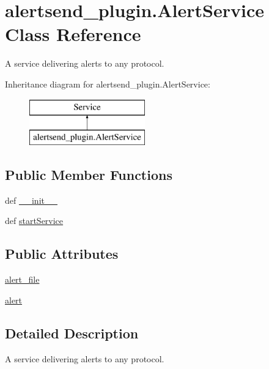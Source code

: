 \hypertarget{classalertsend__plugin_1_1_alert_service}{\section{alertsend\-\_\-plugin.\-Alert\-Service Class Reference}
\label{classalertsend__plugin_1_1_alert_service}
}


A service delivering alerts to any protocol.  


Inheritance diagram for alertsend\-\_\-plugin.\-Alert\-Service\-:\begin{figure}[H]
\begin{center}
\leavevmode
\includegraphics[height=2.000000cm]{d4/d17/classalertsend__plugin_1_1_alert_service}
\end{center}
\end{figure}
\subsection*{Public Member Functions}
\begin{DoxyCompactItemize}
\item 
def \hyperlink{classalertsend__plugin_1_1_alert_service_aad30f49127f44fed9d6bc0ae6ecb9ada}{\-\_\-\-\_\-init\-\_\-\-\_\-}
\item 
def \hyperlink{classalertsend__plugin_1_1_alert_service_ac431be3a763d8f455dd16fcd6f6fe872}{start\-Service}
\end{DoxyCompactItemize}
\subsection*{Public Attributes}
\begin{DoxyCompactItemize}
\item 
\hyperlink{classalertsend__plugin_1_1_alert_service_acc72890f5638b996635878a4b21f7f2b}{alert\-\_\-file}
\item 
\hyperlink{classalertsend__plugin_1_1_alert_service_a91b88386bc56aabc6e5e0477eb4f5946}{alert}
\end{DoxyCompactItemize}


\subsection{Detailed Description}
A service delivering alerts to any protocol. 

